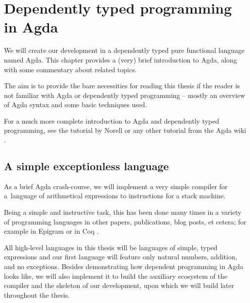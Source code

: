 \chapter{Dependently typed programming in Agda}
\label{chap:dependent-types}

We will create our development in a dependently typed pure functional language named Agda.
This chapter provides a (very) brief introduction to Agda, along with some commentary about
related topics.


The aim is to provide the bare necessities for reading this thesis if the reader is not
familiar with Agda or dependently typed programming -- mostly an overview of Agda syntax and some
basic techniques used.


For a much more complete introduction to Agda and dependently typed programming, see the
tutorial by Norell \cite{norell08} or any other tutorial from the Agda wiki \cite{agda-wiki}.

\section{A simple exceptionless language}
\label{sec:simple-language}

As a brief Agda crash-course, we will implement a very simple compiler for
a~language of arithmetical expressions to instructions for a stack machine.

Being a simple and instructive task, this has been done many times in a variety
of programming languages in other papers, publications, blog posts, et cetera;
for example in Epigram \cite{epigram-compiler} or in Coq \cite{chlipala:compiler}.

All high-level languages in this thesis will be languages of simple, typed
expressions and our first language will feature only natural numbers, addition,
and no exceptions. Besides demonstrating how dependent programming in Agda
looks like, we will also implement it to build the auxiliary ecosystem of the
compiler and the skeleton of our development, upon which we will build later
throughout the thesis.

